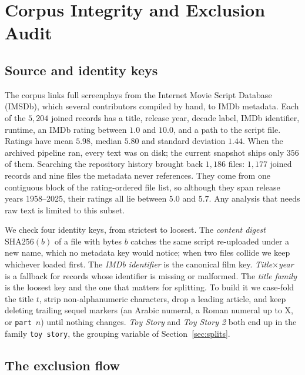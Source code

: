 \documentclass[conference,a4paper]{IEEEtran}
\begin{document}
\section{Corpus Integrity and Exclusion Audit}
\label{sec:corpus}

\subsection{Source and identity keys}

The corpus links full screenplays from the Internet Movie Script
Database (IMSDb), which several contributors compiled by hand, to IMDb
metadata. Each of the $5{,}204$ joined records has a title, release year,
decade label, IMDb identifier, runtime, an IMDb rating between $1.0$ and
$10.0$, and a path to the script file. Ratings have mean $5.98$, median
$5.80$ and standard deviation $1.44$. When the archived pipeline ran,
every text was on disk; the current snapshot ships only $356$ of them.
Searching the repository history brought back $1{,}186$ files: $1{,}177$
joined records and nine files the metadata never references. They come
from one contiguous block of the rating-ordered file list, so although
they span release years 1958--2025, their ratings all lie between $5.0$
and $5.7$. Any analysis that needs raw text is limited to this subset.

We check four identity keys, from strictest to loosest. The
\emph{content digest}
$\mathrm{SHA256}(b)$ of a file with bytes $b$ catches the same script
re-uploaded under a new name, which no metadata key would notice; when
two files collide we keep whichever loaded first. The \emph{IMDb
identifier} is the canonical film key. \emph{Title$\times$year} is a
fallback for records whose identifier is missing or malformed. The
\emph{title family} is the loosest key and the one that matters for
splitting. To build it we case-fold the title $t$, strip
non-alphanumeric characters, drop a leading article, and keep deleting
trailing sequel markers (an Arabic numeral, a Roman numeral up to
$\mathrm{X}$, or \texttt{part}~$n$) until nothing changes. \emph{Toy
Story} and \emph{Toy Story 2} both end up in the family \texttt{toy
story}, the grouping variable of Section~\ref{sec:splits}.

\subsection{The exclusion flow}
\label{sec:flow}
\end{document}
